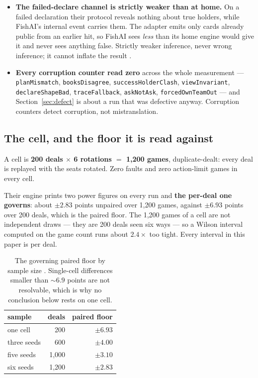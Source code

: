 \documentclass[11pt]{article}
\newcommand{\code}[1]{\texttt{#1}}
\begin{document}
\begin{itemize}
\item \textbf{The failed-declare channel is strictly weaker than at home.} On a failed declaration
their protocol reveals nothing about true holders, while FishAI's internal event carries them. The
adapter emits only cards already public from an earlier hit, so FishAI sees \emph{less} than its
home engine would give it and never sees anything false. Strictly weaker inference, never wrong
inference; it cannot inflate the result \cite{crossplay}.
\item \textbf{Every corruption counter read zero} across the whole measurement ---
\code{planMismatch}, \code{booksDisagree}, \code{successHolderClash}, \code{viewInvariant},
\code{declareShapeBad}, \code{traceFallback}, \code{askNotAsk}, \code{forcedOwnTeamOut} --- and
Section~\ref{sec:defect} is about a run that was defective anyway. Corruption counters detect
corruption, not mistranslation.
\end{itemize}

\subsection{The cell, and the floor it is read against}
\label{sec:floor}

A cell is \textbf{200 deals $\times$ 6 rotations $=$ 1{,}200 games}, duplicate-dealt: every deal is
replayed with the seats rotated. Zero faults and zero action-limit games in every cell.

Their engine prints two power figures on every run and \textbf{the per-deal one governs}: about
$\pm 2.83$ points unpaired over 1{,}200 games, against $\pm 6.93$ points over 200 deals, which is
the paired floor. The 1{,}200 games of a cell are not independent draws --- they are 200 deals seen
six ways --- so a Wilson interval computed on the game count runs about $2.4\times$ too tight. Every
interval in this paper is per deal.

\begin{table}[t]
\centering
\caption{The governing paired floor by sample size \cite{loses}. Single-cell differences smaller
than ${\sim}6.9$ points are not resolvable, which is why no conclusion below rests on one cell.}
\label{tab:floors}
\footnotesize
\begin{tabular}{@{}lrr@{}}
\toprule
sample & deals & paired floor \\
\midrule
one cell     & 200   & $\pm 6.93$ \\
three seeds  & 600   & $\pm 4.00$ \\
five seeds   & 1{,}000 & $\pm 3.10$ \\
six seeds    & 1{,}200 & $\pm 2.83$ \\
\bottomrule
\end{tabular}
\end{table}
\end{document}
